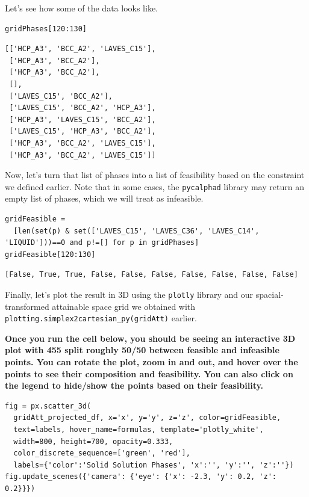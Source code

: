 Let's see how some of the data looks like.

\begin{verbatim}
gridPhases[120:130]
\end{verbatim}

\begin{verbatim}
[['HCP_A3', 'BCC_A2', 'LAVES_C15'],
 ['HCP_A3', 'BCC_A2'],
 ['HCP_A3', 'BCC_A2'],
 [],
 ['LAVES_C15', 'BCC_A2'],
 ['LAVES_C15', 'BCC_A2', 'HCP_A3'],
 ['HCP_A3', 'LAVES_C15', 'BCC_A2'],
 ['LAVES_C15', 'HCP_A3', 'BCC_A2'],
 ['HCP_A3', 'BCC_A2', 'LAVES_C15'],
 ['HCP_A3', 'BCC_A2', 'LAVES_C15']]
\end{verbatim}

Now, let's turn that list of phases into a list of feasibility based on
the constraint we defined earlier. Note that in some cases, the
\texttt{pycalphad} library may return an empty list of
phases, which we will treat as infeasible.

\begin{verbatim}
gridFeasible = 
  [len(set(p) & set(['LAVES_C15', 'LAVES_C36', 'LAVES_C14', 'LIQUID']))==0 and p!=[] for p in gridPhases]
gridFeasible[120:130]
\end{verbatim}

\begin{verbatim}
[False, True, True, False, False, False, False, False, False, False]
\end{verbatim}

Finally, let's plot the result in 3D using the
\texttt{plotly} library and our spacial-transformed
attainable space grid we obtained with
\texttt{plotting.simplex2cartesian\_py(gridAtt)}
earlier.

\textbf{Once you run the cell below, you should be seeing an interactive
3D plot with 455 split roughly 50/50 between feasible and infeasible
points. You can rotate the plot, zoom in and out, and hover over the
points to see their composition and feasibility. You can also click on
the legend to hide/show the points based on their feasibility.}

\begin{verbatim}
fig = px.scatter_3d(
  gridAtt_projected_df, x='x', y='y', z='z', color=gridFeasible, 
  text=labels, hover_name=formulas, template='plotly_white', 
  width=800, height=700, opacity=0.333, 
  color_discrete_sequence=['green', 'red'], 
  labels={'color':'Solid Solution Phases', 'x':'', 'y':'', 'z':''})
fig.update_scenes({'camera': {'eye': {'x': -2.3, 'y': 0.2, 'z': 0.2}}})
\end{verbatim}

